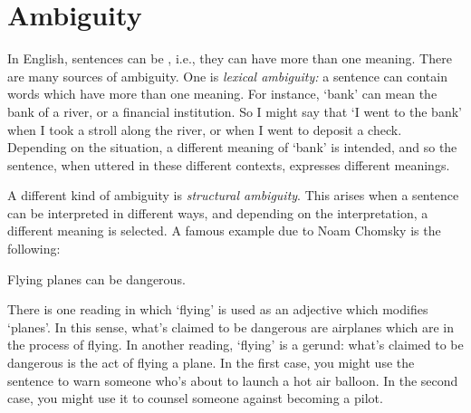 \begin{practiceproblems}
\begin{problemslist}


\end{problemslist}



\end{practiceproblems}





\chapter{Ambiguity}\label{sec:AmbiguityTFL}

In English, sentences can be , i.e., they can have more than one meaning.  There are many sources of ambiguity. One is \emph{lexical ambiguity:} a sentence can contain words which have more than one meaning.  For instance, `bank' can mean the bank of a river, or a financial institution. So I might say that `I went to the bank' when I took a stroll along the river, or when I went to deposit a check.  Depending on the situation, a different meaning of `bank' is intended, and so the sentence, when uttered in these different contexts, expresses different meanings.

A different kind of ambiguity is \emph{structural ambiguity}.  This arises when a sentence can be interpreted in different ways, and depending on the interpretation, a different meaning is selected.  A famous example due to Noam Chomsky is the following:
\begin{earg}
	\prem Flying planes can be dangerous.
\end{earg}
There is one reading in which `flying' is used as an adjective which modifies `planes'. In this sense, what's claimed to be dangerous are airplanes which are in the process of flying.  In another reading, `flying' is a gerund: what's claimed to be dangerous is the act of flying a plane.  In the first case, you might use the sentence to warn someone who's about to launch a hot air balloon.  In the second case, you might use it to counsel someone against becoming a pilot.

